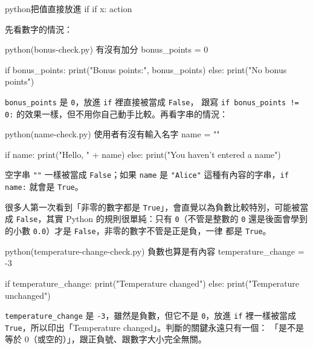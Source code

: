 \begin{code}{python}{把值直接放進 if}
if x:
    action
\end{code}

先看數字的情況：

\begin{example}{python}{(bonus-check.py) 有沒有加分}
bonus_points = 0

if bonus_points:
    print("Bonus points:", bonus_points)
else:
    print("No bonus points")
\end{example}


\texttt{bonus\_points} 是 \texttt{0}，放進 \texttt{if} 裡直接被當成 \texttt{False}，
跟寫 \texttt{if bonus\_points != 0:} 的效果一樣，但不用你自己動手比較。再看字串的情況：

\begin{example}{python}{(name-check.py) 使用者有沒有輸入名字}
name = ""

if name:
    print("Hello, " + name)
else:
    print("You haven't entered a name")
\end{example}


空字串 \texttt{""} 一樣被當成 \texttt{False}；如果 \texttt{name} 是 \texttt{"Alice"}
這種有內容的字串，\texttt{if name:} 就會是 \texttt{True}。


很多人第一次看到「非零的數字都是 \texttt{True}」，會直覺以為負數比較特別，可能被當成
\texttt{False}，其實 Python 的規則很單純：只有 \texttt{0}（不管是整數的 \texttt{0}
還是後面會學到的小數 \texttt{0.0}）才是 \texttt{False}，非零的數字不管是正是負，一律
都是 \texttt{True}。

\begin{example}{python}{(temperature-change-check.py) 負數也算是有內容}
temperature_change = -3

if temperature_change:
    print("Temperature changed")
else:
    print("Temperature unchanged")
\end{example}


\texttt{temperature\_change} 是 \texttt{-3}，雖然是負數，但它不是 \texttt{0}，放進
\texttt{if} 裡一樣被當成 \texttt{True}，所以印出「Temperature changed」。判斷的關鍵永遠只有一個：
「是不是等於 0（或空的）」，跟正負號、跟數字大小完全無關。

